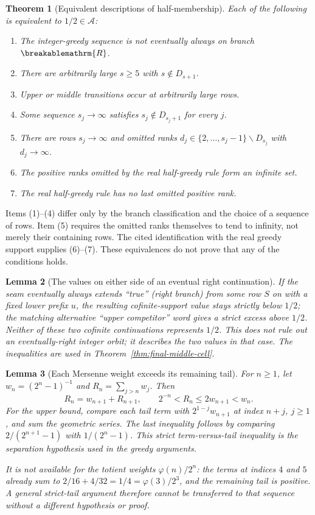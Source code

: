 \documentclass[11pt]{article}
\theoremstyle{plain}
\newtheorem{thm}{Theorem}[section]
\newtheorem{lem}[thm]{Lemma}
\theoremstyle{definition}
\theoremstyle{remark}
\renewcommand{\mathrm}[1]{\ifmmode\breakablemathrm{#1}\else\textrm{#1}\fi}%
\begin{document}
\begin{thm}[Equivalent descriptions of half-membership]
\label{thm:nine-way-hub}
Each of the following is equivalent to $1/2\in\mathcal A$:
\begin{enumerate}[label=(\arabic*),nosep]
\item The integer-greedy sequence is not eventually always on branch $\mathrm R$.
\item There are arbitrarily large $s\ge5$ with $s\notin D_{s+1}$.
\item Upper or middle transitions occur at arbitrarily large rows.
\item Some sequence $s_j\to\infty$ satisfies $s_j\notin D_{s_j+1}$ for every $j$.
\item There are rows $s_j\to\infty$ and omitted ranks
$d_j\in\{2,\ldots,s_j-1\}\smallsetminus D_{s_j}$ with $d_j\to\infty$.
\item The positive ranks omitted by the real half-greedy rule form an infinite set.
\item The real half-greedy rule has no last omitted positive rank.
\end{enumerate}
\end{thm}
Items (1)--(4) differ only by the branch classification and the choice
of a sequence of rows.  Item (5) requires the omitted ranks themselves
to tend to infinity, not merely their containing rows.  The cited
identification with the real greedy support supplies (6)--(7).
These equivalences do not prove that any of the conditions holds.

\begin{lem}[The values on either side of an eventual right continuation]
\label{lem:eventually-right-impossible}
If the seam eventually always extends ``true'' (right branch) from some row $S$ on with a
fixed lower prefix $u$, the resulting cofinite-support value stays strictly below $1/2$; the matching
alternative ``upper competitor'' word gives a strict excess \emph{above} $1/2$. Neither of these two cofinite continuations represents $1/2$.
This does not rule out an eventually-right integer orbit; it describes
the two values in that case.  The inequalities are used in
Theorem~\ref{thm:final-middle-cell}.
\end{lem}

\begin{lem}[Each Mersenne weight exceeds its remaining tail]
\label{lem:mersenne-tail-weight}
For $n\ge1$, let $w_n=(2^n-1)^{-1}$ and
$R_n=\sum_{j>n}w_j$.  Then
\[
 R_n=w_{n+1}+R_{n+1},\qquad
 2^{-n}<R_n\le2w_{n+1}<w_n.
\]
For the upper bound, compare each tail term with
$2^{1-j}w_{n+1}$ at index $n+j$, $j\ge1$, and sum the
geometric series.  The last inequality follows by comparing
$2/(2^{n+1}-1)$ with $1/(2^n-1)$.
This strict term-versus-tail inequality is the separation hypothesis
used in the greedy arguments.

It is not available for the totient weights $\varphi(n)/2^n$:
the terms at indices $4$ and $5$ already sum to
$2/16+4/32=1/4=\varphi(3)/2^3$, and the remaining tail is
positive.  A general strict-tail argument therefore cannot be
transferred to that sequence without a different hypothesis or
proof.
\end{lem}
\end{document}
